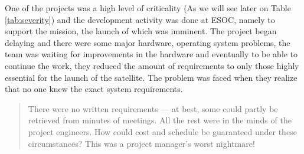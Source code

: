 {One of the projects was a high level of criticality (As we will see later on Table \ref{tab:severity}) and the
development activity was done at \ac{ESOC}, namely to support the mission, the launch of which was imminent.
The project began delaying and there were some major hardware, operating system problems, the team was waiting for improvements in the hardware
and eventually to be able to continue the work, they reduced the amount of requirements to only
those highly essential for the launch of the satellite. The problem was faced when they realize that no one knew the exact system requirements.
\begin{quotation}
There were no written requirements — at best, some could partly be
retrieved from minutes of meetings. All the rest were in the minds of the project engineers. How
could cost and schedule be guaranteed under these circumstances? This was a project manager's
worst nightmare!\cite{esa-bulletin-90}
\end{quotation}

}
